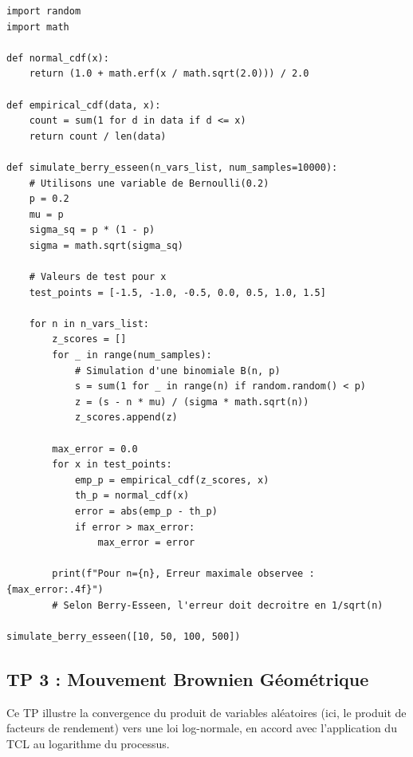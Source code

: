 \documentclass[11pt,a4paper]{article}
\begin{document}
\begin{lstlisting}
import random
import math

def normal_cdf(x):
    return (1.0 + math.erf(x / math.sqrt(2.0))) / 2.0

def empirical_cdf(data, x):
    count = sum(1 for d in data if d <= x)
    return count / len(data)

def simulate_berry_esseen(n_vars_list, num_samples=10000):
    # Utilisons une variable de Bernoulli(0.2)
    p = 0.2
    mu = p
    sigma_sq = p * (1 - p)
    sigma = math.sqrt(sigma_sq)

    # Valeurs de test pour x
    test_points = [-1.5, -1.0, -0.5, 0.0, 0.5, 1.0, 1.5]

    for n in n_vars_list:
        z_scores = []
        for _ in range(num_samples):
            # Simulation d'une binomiale B(n, p)
            s = sum(1 for _ in range(n) if random.random() < p)
            z = (s - n * mu) / (sigma * math.sqrt(n))
            z_scores.append(z)

        max_error = 0.0
        for x in test_points:
            emp_p = empirical_cdf(z_scores, x)
            th_p = normal_cdf(x)
            error = abs(emp_p - th_p)
            if error > max_error:
                max_error = error

        print(f"Pour n={n}, Erreur maximale observee : {max_error:.4f}")
        # Selon Berry-Esseen, l'erreur doit decroitre en 1/sqrt(n)

simulate_berry_esseen([10, 50, 100, 500])
\end{lstlisting}


\vspace{1cm}
\subsection*{TP 3 : Mouvement Brownien Géométrique}

Ce TP illustre la convergence du produit de variables aléatoires (ici, le produit de facteurs de rendement) vers une loi log-normale, en accord avec l'application du TCL au logarithme du processus.
\end{document}
